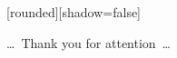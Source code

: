 
{
  [rounded][shadow=false]
  \begin{frame}[plain]
    \begin{block}{}
      \begin{center}
        \ldots~Thank you for attention~\ldots
      \end{center}
    \end{block}
  \end{frame}
}